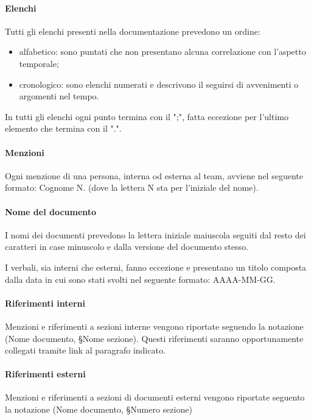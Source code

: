 \documentclass[10pt, a4paper]{article}
\begin{document}
        \paragraph{Elenchi}Tutti gli elenchi presenti nella documentazione prevedono un ordine:
            \begin{itemize}
                \item alfabetico: sono puntati che non presentano alcuna correlazione con l'aspetto temporale;
                \item cronologico: sono elenchi numerati e descrivono il seguirsi di avvenimenti o argomenti nel tempo.
            \end{itemize}
        In tutti gli elenchi ogni punto termina con il ";", fatta eccezione per l'ultimo elemento che termina con il ".".
        
        \paragraph{Menzioni}Ogni menzione di una persona, interna od esterna al team, avviene nel seguente formato: Cognome N. (dove la lettera N sta per l'iniziale del nome).
        
        \paragraph{Nome del documento}I nomi dei documenti prevedono la lettera iniziale maiuscola seguiti dal resto dei caratteri in case minuscolo e dalla versione del documento stesso.

        I verbali, sia interni che esterni, fanno eccezione e presentano un titolo composta dalla data in cui sono stati svolti nel seguente formato: AAAA-MM-GG.

        \paragraph{Riferimenti interni}Menzioni e riferimenti a sezioni interne vengono riportate seguendo la notazione (Nome documento, \S Nome sezione). Questi riferimenti saranno opportunamente collegati tramite link al paragrafo indicato.
        
        \paragraph{Riferimenti esterni}Menzioni e riferimenti a sezioni di documenti esterni vengono riportate seguento la notazione (Nome documento, \S Numero sezione)
\end{document}
